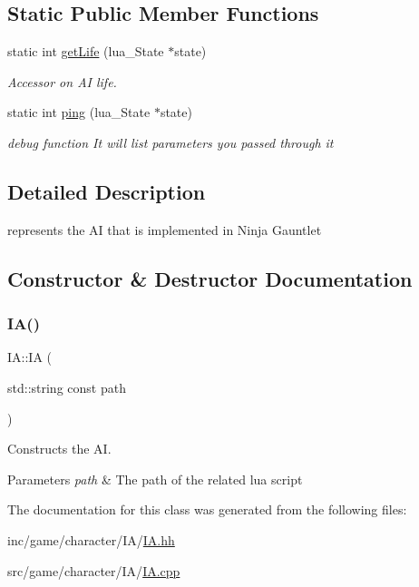 \subsection*{Static Public Member Functions}
\begin{DoxyCompactItemize}
\item 
\mbox{\label{classIA_a1d8f2d91effd6eab9610763bb324d8cd}} 
static int \hyperlink{classIA_a1d8f2d91effd6eab9610763bb324d8cd}{get\+Life} (lua\+\_\+\+State $\ast$state)
\begin{DoxyCompactList}\small\item\em Accessor on AI life. \end{DoxyCompactList}\item 
\mbox{\label{classIA_af8df32744539390d12d6748f0edf0311}} 
static int \hyperlink{classIA_af8df32744539390d12d6748f0edf0311}{ping} (lua\+\_\+\+State $\ast$state)
\begin{DoxyCompactList}\small\item\em debug function It will list parameters you passed through it \end{DoxyCompactList}\end{DoxyCompactItemize}


\subsection{Detailed Description}
represents the AI that is implemented in Ninja Gauntlet 

\subsection{Constructor \& Destructor Documentation}
\mbox{\label{classIA_a5ec5e30441ce9163caf40cbb763c18df}} 
\subsubsection{\texorpdfstring{I\+A()}{IA()}}
{\footnotesize\ttfamily I\+A\+::\+IA (\begin{DoxyParamCaption}\item[{std\+::string const}]{path }\end{DoxyParamCaption})}



Constructs the AI. 


\begin{DoxyParams}{Parameters}
{\em path} & The path of the related lua script \\
\hline
\end{DoxyParams}


The documentation for this class was generated from the following files\+:\begin{DoxyCompactItemize}
\item 
inc/game/character/\+I\+A/\hyperlink{IA_8hh}{I\+A.\+hh}\item 
src/game/character/\+I\+A/\hyperlink{IA_8cpp}{I\+A.\+cpp}\end{DoxyCompactItemize}
